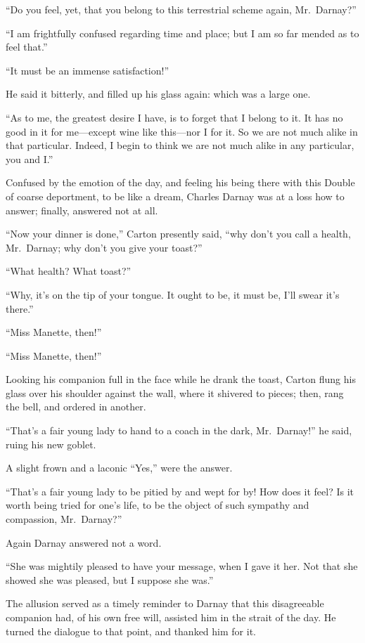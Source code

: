 ``Do you feel, yet, that you belong to this terrestrial scheme again,
Mr.\ Darnay?''

``I am frightfully confused regarding time and place; but I am so far
mended as to feel that.''

``It must be an immense satisfaction!''

He said it bitterly, and filled up his glass again:  which was a large one.

``As to me, the greatest desire I have, is to forget that I belong to
it.  It has no good in it for me---except wine like this---nor I for it.
So we are not much alike in that particular.  Indeed, I begin to think
we are not much alike in any particular, you and I.''

Confused by the emotion of the day, and feeling his being there with
this Double of coarse deportment, to be like a dream, Charles Darnay
was at a loss how to answer; finally, answered not at all.

``Now your dinner is done,'' Carton presently said, ``why don't you call
a health, Mr.\ Darnay; why don't you give your toast?''

``What health?  What toast?''

``Why, it's on the tip of your tongue.  It ought to be, it must be,
I'll swear it's there.''

``Miss Manette, then!''

``Miss Manette, then!''

Looking his companion full in the face while he drank the toast,
Carton flung his glass over his shoulder against the wall, where it
shivered to pieces; then, rang the bell, and ordered in another.

``That's a fair young lady to hand to a coach in the dark, Mr.\ Darnay!''
he said, ruing his new goblet.

A slight frown and a laconic ``Yes,'' were the answer.

``That's a fair young lady to be pitied by and wept for by!  How does it
feel?  Is it worth being tried for one's life, to be the object of such
sympathy and compassion, Mr.\ Darnay?''

Again Darnay answered not a word.

``She was mightily pleased to have your message, when I gave it her.
Not that she showed she was pleased, but I suppose she was.''

The allusion served as a timely reminder to Darnay that this
disagreeable companion had, of his own free will, assisted him in the
strait of the day.  He turned the dialogue to that point, and thanked
him for it.

